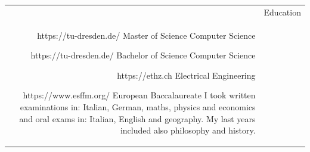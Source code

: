 \documentclass[letterpaper,12pt]{article}
\newcommand{\headingfont}{\Large\color{accent}\BluuNext}
\newenvironment{SectionTable}[1]{
	\renewcommand*{\arraystretch}{1.7}
	\setlength{\tabcolsep}{10pt}
	\begin{longtable}{Rp{5.2in}} & #1 \\}
{\end{longtable}\vspace{-.3cm}}
\begin{document}
\begin{SectionTable}{\headingfont Education}

  {https://tu-dresden.de/}
  {Master of Science}
  {Computer Science}

  {https://tu-dresden.de/}
  {Bachelor of Science}
  {Computer Science}

  {https://ethz.ch}
  {Electrical Engineering}
  {}

  {https://www.esffm.org/}
  {European Baccalaureate}
  { I took written examinations in: Italian, German, maths, physics and economics and oral exams in: Italian, English and geography. My last years included also philosophy and history.}

\end{SectionTable}
\end{document}
